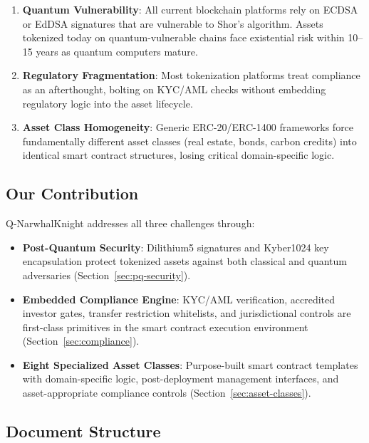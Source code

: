 \documentclass[11pt,a4paper,twoside]{article}
\begin{document}
\begin{enumerate}[label=\textbf{\arabic*.}]
  \item \textbf{Quantum Vulnerability}: All current blockchain platforms rely on ECDSA or EdDSA signatures that are vulnerable to Shor's algorithm. Assets tokenized today on quantum-vulnerable chains face existential risk within 10--15 years as quantum computers mature.

  \item \textbf{Regulatory Fragmentation}: Most tokenization platforms treat compliance as an afterthought, bolting on KYC/AML checks without embedding regulatory logic into the asset lifecycle.

  \item \textbf{Asset Class Homogeneity}: Generic ERC-20/ERC-1400 frameworks force fundamentally different asset classes (real estate, bonds, carbon credits) into identical smart contract structures, losing critical domain-specific logic.
\end{enumerate}

\subsection{Our Contribution}

Q-NarwhalKnight addresses all three challenges through:

\begin{itemize}
  \item \textbf{Post-Quantum Security}: Dilithium5 signatures and Kyber1024 key encapsulation protect tokenized assets against both classical and quantum adversaries (Section~\ref{sec:pq-security}).

  \item \textbf{Embedded Compliance Engine}: KYC/AML verification, accredited investor gates, transfer restriction whitelists, and jurisdictional controls are first-class primitives in the smart contract execution environment (Section~\ref{sec:compliance}).

  \item \textbf{Eight Specialized Asset Classes}: Purpose-built smart contract templates with domain-specific logic, post-deployment management interfaces, and asset-appropriate compliance controls (Section~\ref{sec:asset-classes}).
\end{itemize}

\subsection{Document Structure}
\end{document}
